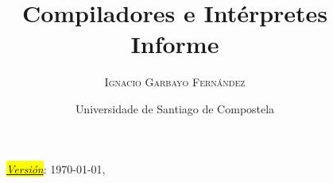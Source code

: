 \documentclass[12pt,a4paper,twoside]{article}
\title{%
	\LARGE \textbf{Compiladores e Intérpretes} \\ \textbf{Informe}}
\author{\textsc{Ignacio Garbayo Fernández}}
\date{Universidade de Santiago de Compostela}
\theoremstyle{definition}
\begin{document}
	
	\maketitle
	\thispagestyle{empty}
	
	\renewcommand{\contentsname}{Índice} %
	\tableofcontents
	
	\vfill
	
	\begin{figure}[H]
		\centering
		\textit{\underline{\colorbox{yellow}{Versión}}}: \today, \currenttime
	\end{figure}
\end{document}
